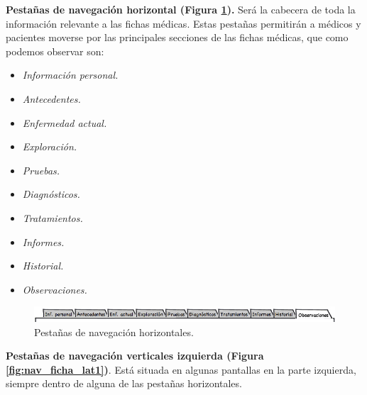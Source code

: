 		\textbf{Pestañas de navegación horizontal (Figura \ref{fig:nav_ficha_sup1}).} Será la cabecera de toda la información relevante a las fichas médicas. Estas pestañas permitirán a médicos y pacientes moverse por las principales secciones de las fichas médicas, que como podemos observar son:
		\begin{itemize}
			\item \textit{Información personal.} 
			\item \textit{Antecedentes.}     
			\item \textit{Enfermedad actual.}
			\item \textit{Exploración.}
			\item \textit{Pruebas.}
			\item \textit{Diagnósticos.}     
			\item \textit{Tratamientos.}
			\item \textit{Informes.}
			\item \textit{Historial.}
			\item \textit{Observaciones.}     
		\end{itemize}
		
		
		\begin{figure}[H]
		  \centering
		    \includegraphics[width=15cm]{img/jpg/nav/fichamedica_sup.jpg}
		  \caption{Pestañas de navegación horizontales.}
		  \label{fig:nav_ficha_sup1}
		\end{figure}
		
		\textbf{Pestañas de navegación verticales izquierda (Figura \ref{fig:nav_ficha_lat1})}. Está situada en algunas pantallas en la parte izquierda, siempre dentro de alguna de las pestañas horizontales.
		
		
